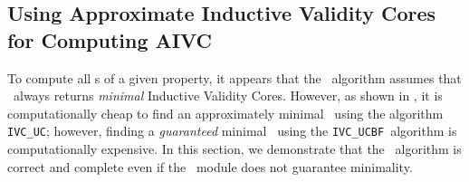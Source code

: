 \subsection{Using Approximate Inductive Validity Cores for Computing AIVC}
\label{subsec:minimality}
\newcommand{\ucalg}{\texttt{\small{IVC\_UC}}}
\newcommand{\ucbfalg}{\texttt{\small{IVC\_UCBF}}}

To compute all \ivc s of a given property, it appears that the \aivcalg ~algorithm
assumes that \getivc\ always returns \emph{minimal} Inductive Validity Cores.
However, as shown in \cite{Ghass16}, it is computationally cheap to find an 
approximately minimal \ivc\ using the algorithm \ucalg; however, finding a {\em guaranteed} minimal \ivc\ using the \ucbfalg\ algorithm is computationally expensive.  In this section,
we demonstrate that the \aivcalg ~algorithm is correct and complete even if the \getivc ~module does not guarantee minimality.  %



